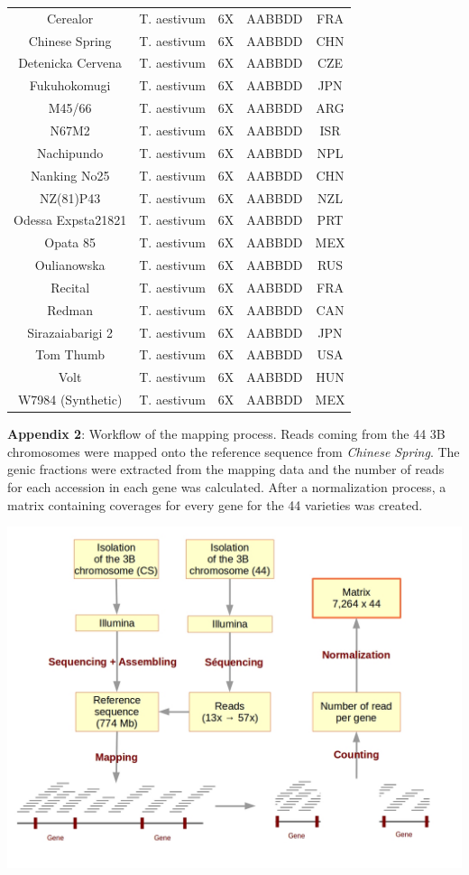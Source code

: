 \documentclass[a4paper, 12pt]{article}
\begin{document}
\begin{longtable}{|c|c|c|c|c|}
Cerealor & T. aestivum & 6X & AABBDD & FRA \\
Chinese Spring & T. aestivum & 6X & AABBDD & CHN \\
Detenicka  Cervena & T. aestivum & 6X & AABBDD & CZE \\
Fukuhokomugi & T. aestivum & 6X & AABBDD & JPN \\
M45/66 & T. aestivum & 6X & AABBDD & ARG \\
N67M2 & T. aestivum & 6X & AABBDD & ISR \\
Nachipundo & T. aestivum & 6X & AABBDD & NPL \\
Nanking No25 & T. aestivum & 6X & AABBDD & CHN \\
NZ(81)P43 & T. aestivum & 6X & AABBDD & NZL \\
Odessa Expsta21821 & T. aestivum & 6X & AABBDD & PRT \\
Opata 85 & T. aestivum & 6X & AABBDD & MEX \\
Oulianowska & T. aestivum & 6X & AABBDD & RUS \\
Recital & T. aestivum & 6X & AABBDD & FRA \\
Redman & T. aestivum & 6X & AABBDD & CAN \\
Sirazaiabarigi 2 & T. aestivum & 6X & AABBDD & JPN \\
Tom Thumb & T. aestivum & 6X & AABBDD & USA \\
Volt & T. aestivum & 6X & AABBDD & HUN \\
W7984 (Synthetic) & T. aestivum & 6X & AABBDD & MEX \\
\hline
\end{longtable}

\newpage
\pagestyle{empty}
\textbf{Appendix 2}: Workflow of the mapping process. Reads coming from the 44 3B chromosomes were mapped onto the reference sequence from \textit{Chinese Spring}. The genic fractions were extracted from the mapping data and the number of reads for each accession in each gene was calculated. After a normalization process, a matrix containing coverages for every gene for the 44 varieties was created.

\vspace{3cm}

\centering \includegraphics[scale=0.4]{appendix/Appendix_3.jpg}
\end{document}
